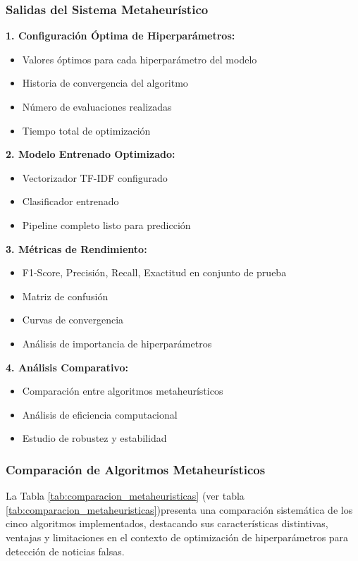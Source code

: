 \subsubsection{Salidas del Sistema Metaheurístico}

\textbf{1. Configuración Óptima de Hiperparámetros:}
\begin{itemize}
    \item Valores óptimos para cada hiperparámetro del modelo
    \item Historia de convergencia del algoritmo
    \item Número de evaluaciones realizadas
    \item Tiempo total de optimización
\end{itemize}

\textbf{2. Modelo Entrenado Optimizado:}
\begin{itemize}
    \item Vectorizador TF-IDF configurado
    \item Clasificador entrenado
    \item Pipeline completo listo para predicción
\end{itemize}

\textbf{3. Métricas de Rendimiento:}
\begin{itemize}
    \item F1-Score, Precisión, Recall, Exactitud en conjunto de prueba
    \item Matriz de confusión
    \item Curvas de convergencia
    \item Análisis de importancia de hiperparámetros
\end{itemize}

\textbf{4. Análisis Comparativo:}
\begin{itemize}
    \item Comparación entre algoritmos metaheurísticos
    \item Análisis de eficiencia computacional
    \item Estudio de robustez y estabilidad
\end{itemize}

\subsubsection{Comparación de Algoritmos Metaheurísticos}

La Tabla \ref{tab:comparacion_metaheuristicas} (ver tabla \ref{tab:comparacion_metaheuristicas})presenta una comparación sistemática de los cinco algoritmos implementados, destacando sus características distintivas, ventajas y limitaciones en el contexto de optimización de hiperparámetros para detección de noticias falsas.

